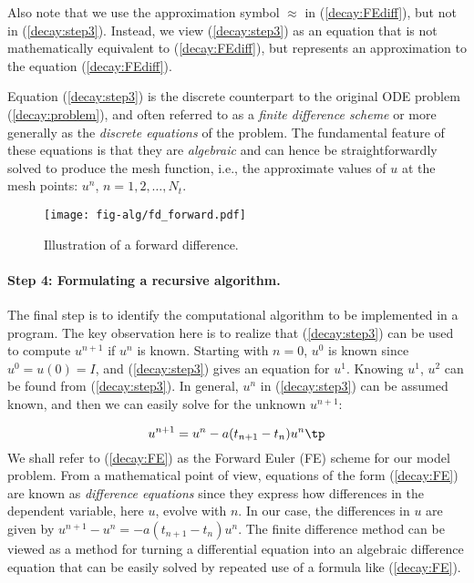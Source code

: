 \documentclass[graybox,sectrefs,envcountresetchap,open=right,final]{svmonodo}
\begin{document}
Also note that we use the approximation symbol $\approx$ in (\ref{decay:FEdiff}),
but not in (\ref{decay:step3}). Instead, we view (\ref{decay:step3}) as
an equation that is not mathematically equivalent to (\ref{decay:FEdiff}),
but represents an approximation to the equation (\ref{decay:FEdiff}).

Equation (\ref{decay:step3})
is the discrete counterpart to the original ODE problem
(\ref{decay:problem}), and often referred to as a \emph{finite difference scheme}
or more generally as the \emph{discrete equations} of the problem.
The fundamental feature of these equations is that they are \emph{algebraic}
and can hence be straightforwardly solved to produce the mesh function, i.e.,
the approximate values of $u$ at
the mesh points: $u^n$, $n=1,2,\ldots,N_t$.


\begin{figure}[!ht]  %
  \centerline{\texttt{[image: fig-alg/fd\_forward.pdf]}}
  \caption{
  Illustration of a forward difference. \label{decay:sketch:FE}
  }
\end{figure}



\paragraph{Step 4: Formulating a recursive algorithm.}
The final step is to identify the computational algorithm to be implemented
in a program. The key observation here is to realize that
(\ref{decay:step3}) can be used to compute $u^{n+1}$ if $u^n$ is known.
Starting with $n=0$, $u^0$ is known since $u^0=u(0)=I$, and
(\ref{decay:step3}) gives an equation for $u^1$. Knowing $u^1$,
$u^2$ can be found from (\ref{decay:step3}). In general, $u^n$
in (\ref{decay:step3}) can be assumed known, and then we can easily solve for
the unknown $u^{n+1}$:

\begin{equation}
u^{n+1} = u^n - a(t_{n+1} -t_n)u^n\tp
\label{decay:FE}
\end{equation}
We shall refer to (\ref{decay:FE}) as the Forward Euler (FE) scheme
for our model problem. From a mathematical point of view,
equations of the form (\ref{decay:FE}) are known as
\emph{difference equations} since they express how differences in
the dependent variable, here $u$, evolve with $n$. In our case,
the differences in $u$ are given by $u^{n+1}-u^n = -a(t_{n+1}-t_n)u^n$.
The finite difference method can be viewed as a method for turning
a differential equation into an algebraic difference equation that
can be easily solved by repeated use of a formula like (\ref{decay:FE}).
\end{document}
